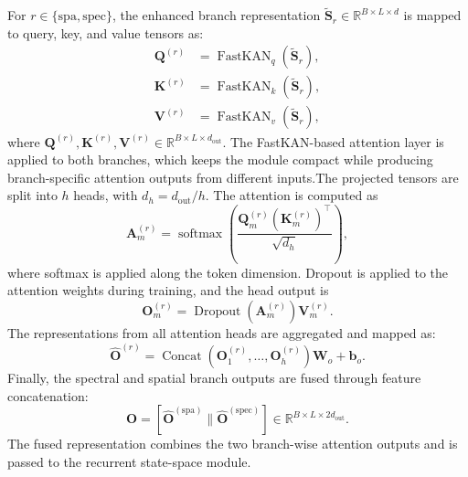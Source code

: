 \documentclass{ieeeaccess}
\begin{document}
For $r\in\{\mathrm{spa},\mathrm{spec}\}$, the enhanced branch representation
$\widetilde{\mathbf{S}}_{r}\in\mathbb{R}^{B\times L\times d}$ is mapped to query, key, and value tensors as:
\begin{equation}
\begin{aligned}
\mathbf{Q}^{(r)}
&=
\operatorname{FastKAN}_{q}
\left(
\widetilde{\mathbf{S}}_{r}
\right),\\
\mathbf{K}^{(r)}
&=
\operatorname{FastKAN}_{k}
\left(
\widetilde{\mathbf{S}}_{r}
\right),\\
\mathbf{V}^{(r)}
&=
\operatorname{FastKAN}_{v}
\left(
\widetilde{\mathbf{S}}_{r}
\right),
\end{aligned}
\label{eq:fssa_qkv}
\end{equation}
where $\mathbf{Q}^{(r)},\mathbf{K}^{(r)},\mathbf{V}^{(r)}\in\mathbb{R}^{B\times L\times d_{\mathrm{out}}}$. The FastKAN-based attention layer is applied to both branches, which keeps the module compact while producing branch-specific attention outputs from different inputs.The projected tensors are split into $h$ heads, with $d_h=d_{\mathrm{out}}/h$. The attention is computed as
\begin{equation}
\mathbf{A}^{(r)}_{m}
=
\operatorname{softmax}
\left(
\frac{
\mathbf{Q}^{(r)}_{m}
\left(
\mathbf{K}^{(r)}_{m}
\right)^{\top}
}
{\sqrt{d_h}}
\right),
\label{eq:fssa_attention}
\end{equation}
where softmax is applied along the token dimension. Dropout is applied to the attention weights during training, and the head output is
\begin{equation}
\mathbf{O}^{(r)}_{m}
=
\operatorname{Dropout}
\left(
\mathbf{A}^{(r)}_{m}
\right)
\mathbf{V}^{(r)}_{m}.
\label{eq:fssa_head_output}
\end{equation}
The representations from all attention heads are aggregated and mapped as:
\begin{equation}
\widehat{\mathbf{O}}^{(r)}
=
\operatorname{Concat}
\left(
\mathbf{O}^{(r)}_{1},
\ldots,
\mathbf{O}^{(r)}_{h}
\right)
\mathbf{W}_{o}
+
\mathbf{b}_{o}.
\label{eq:fssa_output_projection}
\end{equation}
Finally, the spectral and spatial branch outputs are fused through feature concatenation:
\begin{equation}
\mathbf{O}
=
\left[
\widehat{\mathbf{O}}^{(\mathrm{spa})}
\parallel
\widehat{\mathbf{O}}^{(\mathrm{spec})}
\right]
\in
\mathbb{R}^{B\times L\times 2d_{\mathrm{out}}}.
\label{eq:fssa_fusion}
\end{equation}
The fused representation combines the two branch-wise attention outputs and is passed to the recurrent state-space module.
\end{document}
